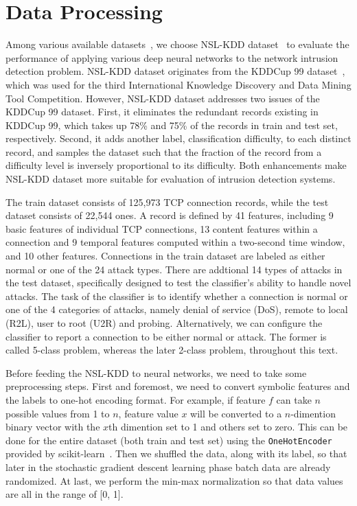 \section{Data Processing}
Among various available datasets~\cite{NSL-KDD, KDDCup, DARPA},
we choose NSL-KDD dataset~\cite{NSL-KDD} to evaluate the performance of applying
various deep neural networks to the network intrusion detection problem.
NSL-KDD dataset originates from the KDDCup 99 dataset~\cite{KDDCup},
which was used for the third International Knowledge Discovery and Data Mining Tool Competition.
However, NSL-KDD dataset addresses two issues of the KDDCup 99 dataset.
First, it eliminates the redundant records existing in KDDCup 99, which takes up
78\% and 75\% of the records in train and test set, respectively.
Second, it adds another label, classification difficulty, to each distinct record,
and samples the dataset such that the fraction of the record
from a difficulty level is inversely proportional to its difficulty.
Both enhancements make NSL-KDD dataset more suitable for
evaluation of intrusion detection systems.

The train dataset consists of 125,973 TCP connection records, while the test dataset
consists of 22,544 ones.
A record is defined by 41 features, including 9 basic features of individual
TCP connections, 13 content features within a connection and 9 temporal features computed
within a two-second time window, and 10 other features.
Connections in the train dataset are labeled as either normal or one of the 24 attack
types.
There are addtional 14 types of attacks in the test dataset, specifically designed to
test the classifier's ability to handle novel attacks.
The task of the classifier is to identify whether a connection is normal or one of the
4 categories of attacks, namely denial of service (DoS), remote to local (R2L), user to
root (U2R) and probing.
Alternatively, we can configure the classifier to report a connection to be either
normal or attack.
The former is called 5-class problem, whereas the later 2-class problem,
throughout this text.

Before feeding the NSL-KDD to neural networks, we need to take some preprocessing steps.
First and foremost, we need to convert symbolic features and the labels to one-hot encoding
format.
For example, if feature $f$ can take $n$ possible values from 1 to $n$,
feature value $x$ will be converted to a $n$-dimention binary vector with the $x$th
dimention set to 1 and others set to zero.
This can be done for the entire dataset (both train and test set)
using the \texttt{OneHotEncoder} provided by scikit-learn~\cite{OneHotEncoder}.
Then we shuffled the data, along with its label, so that later in the stochastic
gradient descent learning phase batch data are already randomized.
At last, we perform the min-max normalization so that data values are all in the range
of [0, 1].
